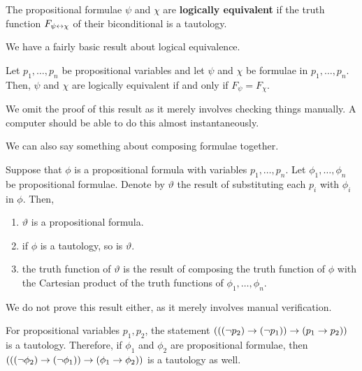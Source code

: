 \begin{boxdefinition}
    The propositional formulae $\psi$ and $\chi$ are \textbf{logically equivalent} if the truth function $F_{\psi \leftrightarrow \chi}$ of their biconditional is a tautology.
\end{boxdefinition}

We have a fairly basic result about logical equivalence.

\begin{lemma}
    Let $p_1, \ldots, p_n$ be propositional variables and let $\psi$ and $\chi$ be formulae in $p_1, \ldots, p_n$. Then, $\psi$ and $\chi$ are logically equivalent if and only if $F_{\psi} = F_{\chi}$.
\end{lemma}

We omit the proof of this result as it merely involves checking things manually. A computer should be able to do this almost instantaneously.

We can also say something about composing formulae together.

\begin{lemma}
    Suppose that $\phi$ is a propositional formula with variables $p_1, \ldots, p_n$. Let $\phi_1, \ldots, \phi_n$ be propositional formulae. Denote by $\vartheta$ the result of substituting each $p_i$ with $\phi_i$ in $\phi$. Then,
    \begin{enumerate}[label = \normalfont (\roman*), noitemsep]
        \item $\vartheta$ is a propositional formula.
        \item if $\phi$ is a tautology, so is $\vartheta$.
        \item the truth function of $\vartheta$ is the result of composing the truth function of $\phi$ with the Cartesian product of the truth functions of $\phi_1, \ldots, \phi_n$.
    \end{enumerate}
\end{lemma}

We do not prove this result either, as it merely involves manual verification.

\begin{boxexample}
    For propositional variables $p_1, p_2$, the statement $\left( \left( \left( \neg p_2 \right) \to \left( \neg p_1 \right) \right) \to \left( p_1 \to p_2 \right) \right)$ is a tautology. Therefore, if $\phi_1$ and $\phi_2$ are propositional formulae, then $\left( \left( \left( \neg \phi_2 \right) \to \left( \neg \phi_1 \right) \right) \to \left( \phi_1 \to \phi_2 \right) \right)$ is a tautology as well.
\end{boxexample}

